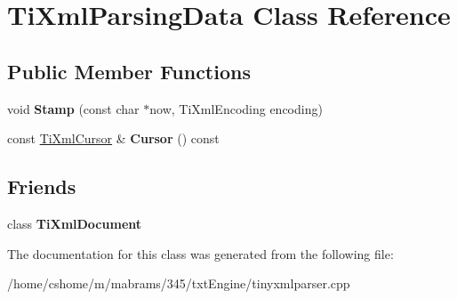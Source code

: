 \hypertarget{class_ti_xml_parsing_data}{
\section{\-Ti\-Xml\-Parsing\-Data \-Class \-Reference}
\label{class_ti_xml_parsing_data}
}
\subsection*{\-Public \-Member \-Functions}
\begin{DoxyCompactItemize}
\item 
\hypertarget{class_ti_xml_parsing_data_a65cee8ab77a36c605db08c84b4c30a7d}{
void {\bfseries \-Stamp} (const char $\ast$now, \-Ti\-Xml\-Encoding encoding)}
\label{class_ti_xml_parsing_data_a65cee8ab77a36c605db08c84b4c30a7d}

\item 
\hypertarget{class_ti_xml_parsing_data_a9e63d965fdb53ff4ac711e105269e918}{
const \hyperlink{struct_ti_xml_cursor}{\-Ti\-Xml\-Cursor} \& {\bfseries \-Cursor} () const }
\label{class_ti_xml_parsing_data_a9e63d965fdb53ff4ac711e105269e918}

\end{DoxyCompactItemize}
\subsection*{\-Friends}
\begin{DoxyCompactItemize}
\item 
\hypertarget{class_ti_xml_parsing_data_a173617f6dfe902cf484ce5552b950475}{
class {\bfseries \-Ti\-Xml\-Document}}
\label{class_ti_xml_parsing_data_a173617f6dfe902cf484ce5552b950475}

\end{DoxyCompactItemize}


\-The documentation for this class was generated from the following file\-:\begin{DoxyCompactItemize}
\item 
/home/cshome/m/mabrams/345/txt\-Engine/tinyxmlparser.\-cpp\end{DoxyCompactItemize}
